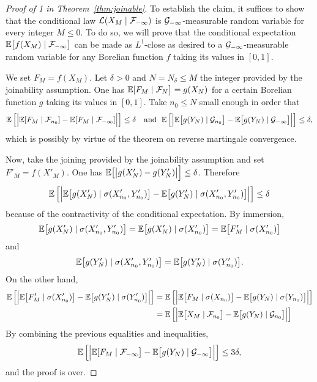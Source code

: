 \documentclass[12pt,a4paper]{article}
\begin{document}
\begin{proof}[Proof of 1 in Theorem~\ref{thm:joinable}]
To establish the claim, it suffices to show that 
the conditional law $\mathcal{L}(X_M \mid \mathcal{F}_{-\infty})$ is 
$\mathcal{G}_{-\infty}$-measurable random variable for every integer $M \leq 0$. 
To do so, we will prove that the conditional expectation 
$\mathbb{E}\bigl[f(X_{M}) \mid \mathcal{F}_{-\infty}\bigr]$ can be made as $L^1$-close as desired to a 
$\mathcal{G}_{-\infty}$-measurable random variable for any Borelian function $f$ 
taking its values in $[0,1]$. 

We set $F_M=f(X_M)$. Let $\delta>0$ and $N = N_\delta \leq M$ 
the integer provided by the joinability assumption. 
One has 
$\mathbb{E}[F_M \mid \mathcal{F}_{N}\bigr] = g(X_{N})$ 
for a certain Borelian function $g$ taking its values in $[0,1]$. 
Take $n_0 \leq N$ small enough in order that 
$$
\mathbb{E}\left[ \Bigr| 
\mathbb{E}[F_M \mid \mathcal{F}_{n_0}] - \mathbb{E}[F_M \mid \mathcal{F}_{-\infty}] 
\Bigl| \right] 
\leq \delta
\quad \text{and }\; 
\mathbb{E}\left[ \Bigr| 
\mathbb{E}\bigl[g(Y_N) \mid \mathcal{G}_{n_0}\bigr] - \mathbb{E}\bigl[g(Y_N) \mid \mathcal{G}_{-\infty}\bigr]
\Bigl| \right] 
\leq \delta,
$$
which is possibly by virtue of the theorem on reverse martingale convergence. 

Now, take the joining provided by the joinability assumption and set $F'_M=f(X'_M)$. 
One has $\mathbb{E}\bigl[\bigl|g(X'_N) - g(Y'_N)\bigr|\Bigr] \leq \delta$. Therefore 
$$
\mathbb{E}\left[ \Bigr|\mathbb{E}\bigl[g(X'_N) \mid \sigma(X'_{n_0}, Y'_{n_0})\bigr] 
 - \mathbb{E}\bigl[g(Y'_N) \mid \sigma(X'_{n_0}, Y'_{n_0}) \bigr] \Bigl| \right] \leq \delta
$$
because of the contractivity of the conditional expectation. 
By immersion, 
$$
\mathbb{E}\bigl[g(X'_N) \mid \sigma(X'_{n_0}, Y'_{n_0})\bigr] 
= \mathbb{E}\bigl[g(X'_N) \mid \sigma(X'_{n_0})\bigr] = \mathbb{E}\bigl[F'_M \mid \sigma(X'_{n_0})\bigr]
$$
and 
$$
\mathbb{E}\bigl[g(Y'_N) \mid \sigma(X'_{n_0}, Y'_{n_0})\bigr] 
= \mathbb{E}\bigl[g(Y'_N) \mid \sigma(Y'_{n_0})\bigr]. 
$$
On the other hand, 
\begin{align*}
\mathbb{E}\left[ \Bigr| 
\mathbb{E}\bigl[F'_M \mid \sigma(X'_{n_0})\bigr] 
 - \mathbb{E}\bigl[g(Y'_N) \mid \sigma(Y'_{n_0})\bigr] 
\Bigl| \right] 
& = \mathbb{E}\left[ \Bigr| 
\mathbb{E}\bigl[F_M \mid \sigma(X_{n_0})\bigr] 
 - \mathbb{E}\bigl[g(Y_N) \mid \sigma(Y_{n_0})\bigr] 
\Bigl| \right] \\
& = \mathbb{E}\left[ \Bigr| 
\mathbb{E}\bigl[X_M \mid \mathcal{F}_{n_0}\bigr] 
 - \mathbb{E}\bigl[g(Y_N) \mid \mathcal{G}_{n_0}\bigr] 
\Bigl| \right]
\end{align*}
By combining the previous equalities and inequalities, 
$$
\mathbb{E}\left[ \Bigr| 
\mathbb{E}[F_M \mid \mathcal{F}_{-\infty}\bigr]  -  \mathbb{E}\bigl[g(Y_N) \mid \mathcal{G}_{-\infty}\bigr]
\Bigl| \right] 
\leq 3\delta,
$$
and the proof is over.
\end{proof}
\end{document}
